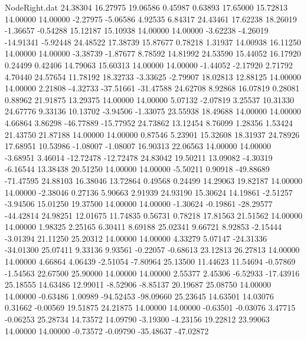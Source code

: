 \begin{filecontents}{NodeRight.dat}
  24.38304   16.27975   19.06586     0.45987    0.63893   17.65000   15.72813   14.00000   14.00000   -2.27975   -5.06586    4.92535    6.84317
  24.43461   17.62238   18.26019    -1.36657   -0.54288   15.12187   15.10938   14.00000   14.00000   -3.62238   -4.26019  -14.91341   -5.92448
  24.48522   17.38739   15.87677     0.78218    1.31937   14.00938   16.11250   14.00000   14.00000   -3.38739   -1.87677    8.78592   14.81992
  24.53590   15.44052   16.17920     0.24499    0.42406   14.79063   15.60313   14.00000   14.00000   -1.44052   -2.17920    2.71792    4.70440
  24.57654   11.78192   18.32733    -3.33625   -2.79907   18.02813   12.88125   14.00000   14.00000    2.21808   -4.32733  -37.51661  -31.47588
  24.62708    8.92868   16.07819     0.28081    0.88962   21.91875   13.29375   14.00000   14.00000    5.07132   -2.07819    3.25537   10.31330
  24.67776    9.33136   10.13702    -3.94506   -1.33075   23.55938   18.49688   14.00000   14.00000    4.66864    3.86298  -46.77889  -15.77952
  24.73862   13.12454    8.76099     1.28356    1.53424   21.43750   21.87188   14.00000   14.00000    0.87546    5.23901   15.32608   18.31937
  24.78926   17.68951   10.53986    -1.08007   -1.08007   16.90313   22.06563   14.00000   14.00000   -3.68951    3.46014  -12.72478  -12.72478
  24.83042   19.50211   13.09082    -4.30319   -6.16544   13.38438   20.51250   14.00000   14.00000   -5.50211    0.90918  -49.88689  -71.47595
  24.88103   16.38046   13.72864     0.49568    0.24499   14.29063   19.82187   14.00000   14.00000   -2.38046    0.27136    5.90663    2.91939
  24.93190   15.30624   14.19861    -2.51257   -3.94506   15.01250   19.37500   14.00000   14.00000   -1.30624   -0.19861  -28.29577  -44.42814
  24.98251   12.01675   11.74835     0.56731    0.78218   17.81563   21.51562   14.00000   14.00000    1.98325    2.25165    6.30411    8.69188
  25.02341    9.66721    8.92853    -2.15444   -3.01394   21.11250   25.20312   14.00000   14.00000    4.33279    5.07147  -24.31336  -34.01300
  25.07411    9.33136    9.93561    -0.22057   -0.68613   23.12813   26.27813   14.00000   14.00000    4.66864    4.06439   -2.51054   -7.80964
  25.13500   11.44623   11.54694    -0.57869   -1.54563   22.67500   25.90000   14.00000   14.00000    2.55377    2.45306   -6.52933  -17.43916
  25.18555   14.63486   12.99011    -8.52906   -8.85137   20.19687   25.08750   14.00000   14.00000   -0.63486    1.00989  -94.52453  -98.09660
  25.23645   14.63501   14.03076     0.31662   -0.00569   19.51875   24.21875   14.00000   14.00000   -0.63501   -0.03076    3.47715   -0.06253
  25.28734   14.73572   14.09790    -3.19300   -4.23156   19.22812   23.99063   14.00000   14.00000   -0.73572   -0.09790  -35.48637  -47.02872

\end{filecontents}
